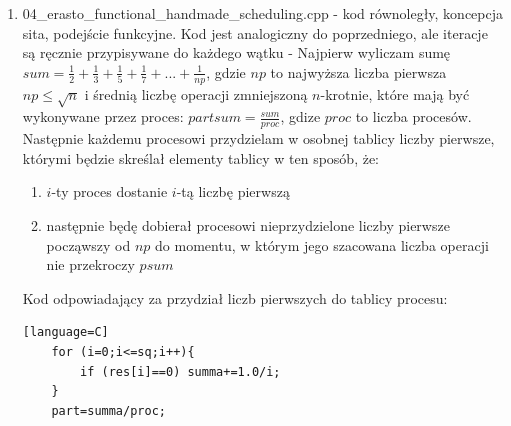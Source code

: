 \documentclass[12pt]{article}
\begin{document}
\begin {enumerate}
\begin{enumerate}
	\end{enumerate}
	\item 04\_erasto\_functional\_handmade\_scheduling.cpp - kod równoległy, koncepcja sita, podejście funkcyjne. Kod jest analogiczny do poprzedniego, ale iteracje są ręcznie przypisywane do każdego wątku - Najpierw wyliczam sumę \(sum=\frac{1}{2}+\frac{1}{3}+\frac{1}{5}+\frac{1}{7}+...+\frac{1}{np}\), gdzie \(np\) to najwyższa liczba pierwsza \(np\le\sqrt{n}\)  i średnią liczbę operacji zmniejszoną \(n\)-krotnie, które mają być wykonywane przez proces: \(partsum=\frac{sum}{proc}\), gdize \(proc\) to liczba procesów. Następnie każdemu procesowi przydzielam w osobnej tablicy liczby pierwsze, którymi będzie skreślał elementy tablicy w ten sposób, że:
	\begin{enumerate}
		\item \(i\)-ty proces dostanie \(i\)-tą liczbę pierwszą
		\item następnie będę dobierał procesowi nieprzydzielone liczby pierwsze począwszy od \(np\) do momentu, w którym jego szacowana liczba operacji nie przekroczy \(psum\)
	\end{enumerate}
	Kod odpowiadający za przydział liczb pierwszych do tablicy procesu:
	\begin{lstlisting}[style=mystyle, caption=  Ręczny scheduling sita funkcyjnego][language=C]
	for (i=0;i<=sq;i++){
		if (res[i]==0) summa+=1.0/i;
	}
	part=summa/proc;
	

\end{lstlisting}
\end{enumerate}
\end{document}
